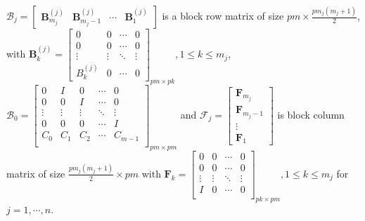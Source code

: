 \documentclass[12pt, reqno]{amsart}
\theoremstyle{definition}
\theoremstyle{remark}
\numberwithin{equation}{section}
\begin{document}
\noindent
$\mathcal{B}_j = \begin{bmatrix}
\textbf{B}_{m_j}^{(j)} & \textbf{B}_{m_j-1}^{(j)} & \cdots & \textbf{B}_1^{(j)}
\end{bmatrix}$ is a block row matrix of size $\displaystyle pm \times 
\frac{pm_j(m_j+1)}{2}$, with $\textbf{B}_k^{(j)} = \begin{bmatrix}
0 & 0 & \cdots & 0 \\
0 & 0 & \cdots & 0 \\
\vdots & \vdots & \ddots & \vdots \\
B_{k}^{(j)} & 0 & \cdots & 0
\end{bmatrix}_{pm \times pk}, 1 \leq k \leq m_j $, \\
$\mathcal{B}_0 = \begin{bmatrix}
0 & I & 0 & \cdots & 0\\
0 & 0 & I & \cdots & 0\\
\vdots & \vdots & \vdots & \ddots & \vdots\\
0 & 0 & 0 & \cdots & I\\
C_0 & C_1 & C_2 & \cdots & C_{m-1}\\ 
\end{bmatrix}_{pm \times pm}$ and
$\mathcal{F}_j = \begin{bmatrix}
\textbf{F}_{m_j} \\
\textbf{F}_{m_j-1} \\
\vdots \\
\textbf{F}_1
\end{bmatrix}$ is block column \\
matrix of size $\displaystyle \frac{pm_j(m_j+1)}{2} 
\times pm$ with $ \textbf{F}_k =\begin{bmatrix}
0 & 0 & \cdots & 0\\
0 & 0 & \cdots & 0\\
\vdots & \vdots & \ddots & \vdots \\
I & 0 & \cdots & 0 \\
\end{bmatrix}_{pk \times pm}, 1 \leq k \leq m_j$ for $j = 1,\cdots, n$. 
\end{document}
